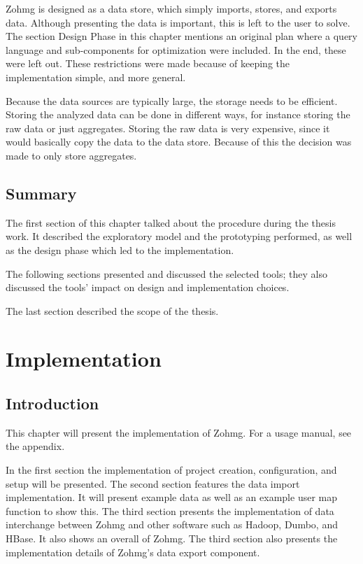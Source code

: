 Zohmg is designed as a data store, which simply imports, stores, and exports
data. Although presenting the data is important, this is left to the user to
solve. The section Design Phase in this chapter mentions an original plan where
a query language and sub-components for optimization were included. In the end,
these were left out. These restrictions were made because of keeping the
implementation simple, and more general.

Because the data sources are typically large, the storage needs to be efficient.
Storing the analyzed data can be done in different ways, for instance storing
the raw data or just aggregates. Storing the raw data is very expensive, since
it would basically copy the data to the data store. Because of this the decision
was made to only store aggregates.


\section*{Summary}

The first section of this chapter talked about the procedure during the thesis
work. It described the exploratory model and the prototyping performed, as well
as the design phase which led to the implementation.

The following sections presented and discussed the selected tools; they also
discussed the tools' impact on design and implementation choices.

The last section described the scope of the thesis.



\chapter{Implementation}



\section*{Introduction}

This chapter will present the implementation of Zohmg. For a usage manual, see
the appendix.


In the first section the implementation of project creation, configuration, and
setup will be presented. The second section features the data import
implementation. It will present example data as well as an example user map
function to show this. The third section presents the implementation of data
interchange between Zohmg and other software such as Hadoop, Dumbo, and HBase.
It also shows an overall of Zohmg. The third section also presents the
implementation details of Zohmg's data export component.


